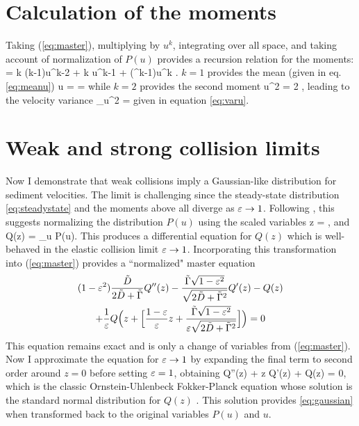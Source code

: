 \section{Calculation of the moments}
\label{sec:langmoments}
Taking (\ref{eq:master}), multiplying by $u^k$, integrating over all space, and taking account of normalization of $P(u)$ provides a recursion relation for the moments: 
 =  k (k-1)\langle u^{k-2} \rangle + \tilde{\Gamma} k \langle u^{k-1} \rangle + (\ve^k-1)\langle u^k \rangle. \ee
$k=1$ provides the mean (given in eq. \ref{eq:meanu})
\be \langle u \rangle =  = \ee
while $k=2$ provides the second moment
\be \langle u^2 \rangle = 2 , \ee
leading to the velocity variance
\be \sigma_u^2 = \ee
given in equation \ref{eq:varu}.
\section{Weak and strong collision limits}
\label{sec:langextremes}
Now I demonstrate that weak collisions imply a Gaussian-like distribution for sediment velocities. The limit is challenging since the steady-state distribution \ref{eq:steadystate} and the moments above all diverge as $\varepsilon \rightarrow 1$.
Following \cite{Hall1989}, this suggests normalizing the distribution $P(u)$ using the scaled variables
\be z = , \ee
and
\be Q(z) = \sigma_u P(u).\ee
This produces a differential equation for $Q(z)$ which is well-behaved in the elastic collision limit $\varepsilon \rightarrow 1$.
Incorporating this transformation into (\ref{eq:master}) provides a ``normalized" master equation
\begin{multline}(1-\varepsilon^2) \frac{\tilde{D}}{2\tilde{D} + \tilde{\Gamma}} Q''(z) - \frac{\tilde{\Gamma}\sqrt{1-\varepsilon^2}}{\sqrt{2\tilde{D}+\tilde{\Gamma}^2}}Q'(z) - Q(z) \\+ \frac{1}{\varepsilon} Q\Big(z + \Big[\frac{1-\varepsilon}{\varepsilon}z + \frac{\tilde{\Gamma}\sqrt{1-\varepsilon^2}}{\varepsilon\sqrt{2\tilde{D}+\tilde{\Gamma}^2}} \Big]\Big) = 0 \end{multline}
This equation remains exact and is only a change of variables from (\ref{eq:master}).
Now I approximate the equation for $\varepsilon \rightarrow 1$ by expanding the final term to second order around $z=0$ before setting $\varepsilon = 1$, obtaining
\be Q''(z) + z Q'(z) + Q(z) = 0, \ee
which is the classic Ornstein-Uhlenbeck Fokker-Planck equation whose solution is the standard normal distribution for $Q(z)$ \citep[e.g.][]{Gardiner1983}.
This solution provides \ref{eq:gaussian} when transformed back to the original variables $P(u)$ and $u$.

